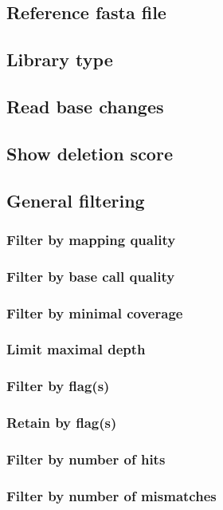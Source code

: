 \documentclass[10pt,a4paper]{article} \usepackage[utf8]{inputenc}
\begin{document}
\subsection{Reference fasta file}

%
\subsection{Library type}

%
\subsection{Read base changes}

\subsection{Show deletion score}

\subsection{General filtering}
\subsubsection{Filter by mapping quality}

\subsubsection{Filter by base call quality}

\subsubsection{Filter by minimal coverage}

\subsubsection{Limit maximal depth}

\subsubsection{Filter by flag(s)}\label{sec:filter_flag}

\subsubsection{Retain by flag(s)}

\subsubsection{Filter by number of hits}

\subsubsection{Filter by number of mismatches}

\end{document}
